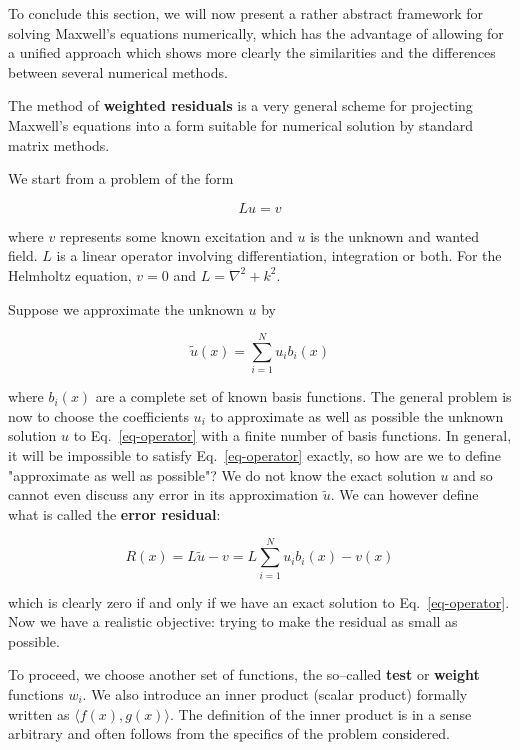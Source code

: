 
To conclude this section, we will now present a rather abstract framework for solving Maxwell's equations numerically, which has the advantage of allowing for a unified approach which shows more clearly the similarities and the differences between several numerical methods.

The method of \textbf{weighted residuals} is a very general scheme for projecting Maxwell's equations into a form suitable for numerical solution by standard matrix methods.

We start from a problem of the form

\begin{equation}
L u = v \label{eq-operator}
\end{equation}

where $v$ represents some known excitation and $u$ is the unknown and wanted field. $L$ is a linear operator involving differentiation, integration or both. For the Helmholtz equation, $v=0$ and $L=\nabla^2 + k^2$. 

Suppose we approximate the unknown $u$ by

\begin{equation}
\tilde{u}(x) = \sum_{i=1}^N u_i b_i(x) \label{eq-expansion}
\end{equation} 

where $b_i(x)$ are a complete set of known basis functions. The general problem is now to choose the coefficients $u_i$ to approximate as well as possible the unknown solution $u$ to Eq.~\ref{eq-operator} with a finite number of basis functions. In general, it will be impossible to satisfy Eq.~\ref{eq-operator} exactly, so how are we to define "approximate as well as possible"? We do not know the exact solution $u$ and so cannot even discuss any error in its approximation $\tilde{u}$. We can however define what is called the \textbf{error residual}:

\begin{equation}
R(x) = L\tilde{u} - v = L \sum_{i=1}^N u_i b_i(x) - v(x)
\end{equation} 

which is clearly zero if and only if we have an exact solution to Eq.~\ref{eq-operator}. Now we have a realistic objective: trying to make the residual as small as possible.

To proceed, we choose another set of functions, the so--called \textbf{test} or \textbf{weight} functions $w_i$. We also introduce an inner product (scalar product) formally written as $\langle f(x),g(x) \rangle$. The definition of the inner product is in a sense arbitrary and often follows from the specifics of the problem considered.

